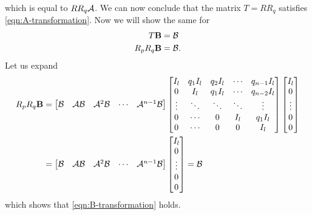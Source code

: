 \begin{appendices}
which is equal to $RR_q\mathcal{A}$. We can now conclude that the matrix $T=RR_q$ satisfies \eqref{eqn:A-transformation}. Now we will show the same for
\begin{equation}\label{eqn:B-transformation}
    \begin{split}
        T\mathbf{B} &= \mathcal{B} \\
        R_pR_q\mathbf{B} &= \mathcal{B}.
    \end{split}
\end{equation}
Let us expand
\begin{equation*}
    \begin{split}
        R_pR_q\mathbf{B} &=
        \begin{bmatrix}
            \mathcal{B} & \mathcal{A}\mathcal{B} & \mathcal{A}^{2}\mathcal{B} & \cdots & \mathcal{A}^{n-1}\mathcal{B} \\
        \end{bmatrix}
        \begin{bmatrix}
            I_l & q_1I_l & q_2I_l & \cdots & q_{n-1}I_l \\
            0 & I_l & q_1I_l & \cdots & q_{n-2}I_l \\
            \vdots & \ddots & \ddots & \ddots & \vdots \\
            0 & \cdots & 0 & I_l & q_1I_l \\
            0 & \cdots & 0 & 0 & I_l \\
        \end{bmatrix}
        \begin{bmatrix}
            I_l \\ 0 \\ \vdots \\ 0 \\ 0 \\
        \end{bmatrix} \\
        &=
        \begin{bmatrix}
            \mathcal{B} & \mathcal{A}\mathcal{B} & \mathcal{A}^{2}\mathcal{B} & \cdots & \mathcal{A}^{n-1}\mathcal{B} \\
        \end{bmatrix}
        \begin{bmatrix}
            I_l \\ 0 \\ \vdots \\ 0 \\ 0 \\
        \end{bmatrix} = \mathcal{B} \\
    \end{split}
\end{equation*}
which shows that \eqref{eqn:B-transformation} holds.


\end{appendices}
